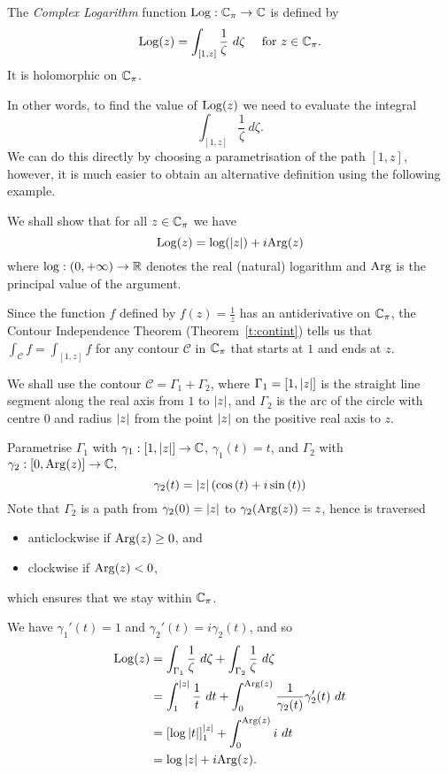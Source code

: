 \begin{definition}
The \emph{Complex Logarithm} function $\operatorname{Log} : \mathbb{C}_{\pi} \to \mathbb{C}$ is defined by
\[
\operatorname{Log} (z) = \int_{[1,z]} \frac{1}{\zeta}\ d \zeta\quad \text{ for } z \in \mathbb{C}_{\pi}.
\]
It is holomorphic on $\mathbb{C}_{\pi}$.
\end{definition}
In other words, to find the value of $\operatorname{Log} (z)$ we need to evaluate the integral
\[
\int_{[1,z]} \frac{1}{\zeta}\ d \zeta.
\]
We can do this directly by choosing a parametrisation of the path $[1,z]$, however, it is much easier to obtain an alternative definition using the following example.
\begin{example}
We shall show that for all $z \in \mathbb{C}_{\pi}$ we have
\[
\operatorname{Log}(z) = \log ( \left| z \right| ) + i \mathrm{Arg} (z)
\]
where $\log:(0,+\infty) \to \mathbb{R}$ denotes the real (natural) logarithm and $\mathrm{Arg}$ is the principal value of the argument.
\end{example}
\begin{solution}
Since the function $f$ defined by $f(z)=\frac{1}{z}$ has an antiderivative on $\mathbb{C}_{\pi}$, the Contour Independence Theorem (Theorem~\ref{t:contint}) tells us that
$\displaystyle \int_{\mathcal{C}} f = \int_{[1,z]} f$ for any contour $\mathcal{C}$ in $\mathbb{C}_{\pi}$ that starts at $1$ and ends at $z$.
\begin{center}
\end{center}
We shall use the contour $\mathcal{C}=\Gamma_1+\Gamma_2$, where $\Gamma_1=[1,\left| z \right|]$ is the straight line segment along the real axis from $1$ to $\left| z \right|$, and $\Gamma_2$ is the arc of the circle with centre $0$ and radius $\left| z \right|$ from the point $\left| z \right|$ on the positive real axis to $z$. 

Parametrise $\Gamma_1$ with $\gamma_1:[1,\left| z \right|] \to \mathbb{C}$, $\gamma_1(t)=t$, and $\Gamma_2$ with $\gamma_2:[0,\mathrm{Arg} (z)] \to \mathbb{C},$
\[
\gamma_2(t) = \left| z \right| \left( \cos \left( t \right) + i \sin \left( t \right) \right)
\]
Note that $\Gamma_2$ is a path from $\gamma_2 (0) = \left| z \right|$ to $\gamma_2 ( \mathrm{Arg} (z)) = z$, hence is traversed 
\begin{itemize}
\item anticlockwise if $\mathrm{Arg} (z) \geq 0$, and
\item clockwise if $\mathrm{Arg}(z)<0$,
\end{itemize}
which ensures that we stay within $\mathbb{C}_{\pi}$.  

We have $\gamma_1'(t)=1$ and $\gamma_2'(t) =  i \gamma_2 (t)$, and so
\begin{align*}
\Log (z) & = \int_{\Gamma_1} \frac{1}{\zeta}\ d\zeta + \int_{\Gamma_2} \frac{1}{\zeta}\ d\zeta \\
& = 
\int_{1}^{\abs{z}} \frac{1}{t}\ dt + \int_0^{\Arg (z)} \frac{1}{\gamma_2(t)} \gamma_2'(t)\ dt \\
& = \left[ \log \abs{t} \right]_1^{\abs{z}} + \int_0^{\Arg (z)} i\ dt \\
& = \log \abs{z} + i \Arg (z).
\end{align*}
\end{solution}
